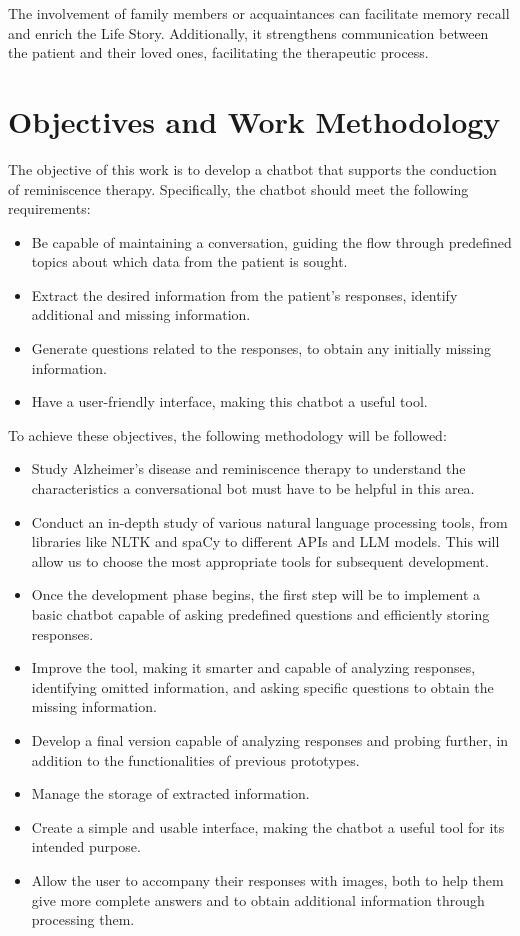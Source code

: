 The involvement of family members or acquaintances can facilitate memory recall and enrich the Life Story. Additionally, it strengthens communication between the patient and their loved ones, facilitating the therapeutic process.

\section{Objectives and Work Methodology}
\label{sec:objectives}

The objective of this work is to develop a chatbot that supports the conduction of reminiscence therapy. Specifically, the chatbot should meet the following requirements:

\begin{itemize}
	\item Be capable of maintaining a conversation, guiding the flow through predefined topics about which data from the patient is sought.
	\item Extract the desired information from the patient's responses, identify additional and missing information.
	\item Generate questions related to the responses, to obtain any initially missing information.
	\item Have a user-friendly interface, making this chatbot a useful tool.
\end{itemize}


To achieve these objectives, the following methodology will be followed:

\begin{itemize}
	\item Study Alzheimer's disease and reminiscence therapy to understand the characteristics a conversational bot must have to be helpful in this area.
	\item Conduct an in-depth study of various natural language processing tools, from libraries like NLTK and spaCy to different APIs and LLM models. This will allow us to choose the most appropriate tools for subsequent development.
	\item Once the development phase begins, the first step will be to implement a basic chatbot capable of asking predefined questions and efficiently storing responses.
	\item Improve the tool, making it smarter and capable of analyzing responses, identifying omitted information, and asking specific questions to obtain the missing information.
	\item Develop a final version capable of analyzing responses and probing further, in addition to the functionalities of previous prototypes.
	\item Manage the storage of extracted information.
	\item Create a simple and usable interface, making the chatbot a useful tool for its intended purpose.
	\item Allow the user to accompany their responses with images, both to help them give more complete answers and to obtain additional information through processing them.
\end{itemize}

